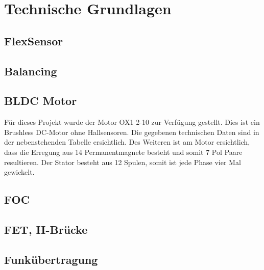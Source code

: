 \chapter{Technische Grundlagen}
\label{TechnischeGrundlagen}
\section{FlexSensor}
\label{tGl_FlexSensor}
\section{Balancing}
\label{tGl_Balancing}
\section{BLDC Motor}
\label{tGl_BLDC}
Für dieses Projekt wurde der Motor OX1 2-10 zur Verfügung gestellt. Dies ist ein Brushless DC-Motor ohne Hallsensoren. Die gegebenen technischen Daten sind in der nebenstehenden Tabelle ersichtlich. 
Des Weiteren ist am Motor ersichtlich, dass die Erregung aus 14 Permanentmagnete besteht und somit 7 Pol Paare resultieren. Der Stator besteht aus 12 Spulen, somit ist jede Phase vier Mal gewickelt.




\section{FOC}
\label{tGl_FOC}
\section{FET, H-Brücke}
\label{tGl_HBrugg}
\section{Funkübertragung}
\label{tGl_RF}
